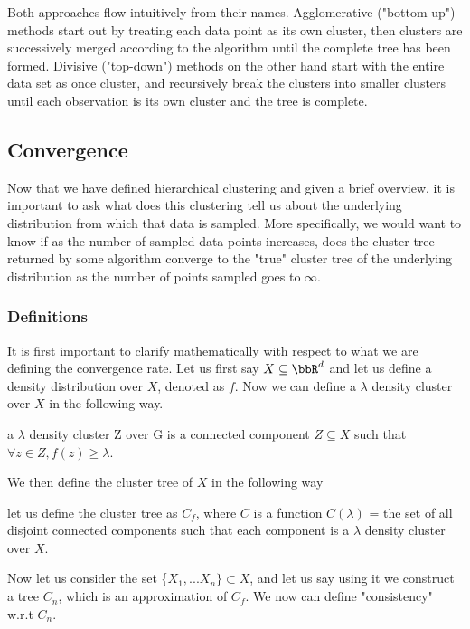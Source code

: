 Both approaches flow intuitively from their names.  Agglomerative ("bottom-up") methods start out by treating each data point as its own cluster, then clusters are successively merged according to the algorithm until the complete tree has been formed.  Divisive ("top-down") methods on the other hand start with the entire data set as once cluster, and recursively break the clusters into smaller clusters until each observation is its own cluster and the tree is complete.




\subsection{Convergence}
Now that we have defined hierarchical clustering and given a brief overview, it is important to ask what does this clustering tell us about the underlying distribution from which that data is sampled.  More specifically, we would want to know if as the number of sampled data points increases, does the cluster tree returned by some algorithm converge to the "true" cluster tree of the underlying distribution as the number of points sampled goes to $\infty$.

\subsubsection{Definitions}
It is first important to clarify mathematically with respect to what we are defining the convergence rate.  Let us first say $X \subseteq \bbR^d$ and let us define a density distribution over $X$, denoted as $f$.  Now we can define a  $\lambda$ density cluster over $X$  in the following way. 
\begin{definition}

 a $\lambda$ density cluster Z over G is a connected component $Z \subseteq X$ such that $\forall z \in Z, f(z) \geq \lambda$.  
 \end{definition}

 We then define the cluster tree of $X$ in the following way
 \begin{definition}
  let us define the cluster tree as $C_f$, where $C$ is a function $C(\lambda)$ = the set of all disjoint connected components such that each component is a $\lambda$ density cluster over $X$. 
 \end{definition} 
 Now let us consider the set \{$X_1, ... X_n\} \subset X$, and let us say using it we construct a tree $C_n$, which is an approximation of $C_f$.  We now can define "consistency" w.r.t $C_n$.  

